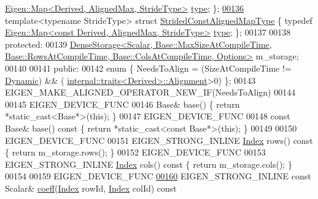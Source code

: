 \begin{DoxyCode}
      \hyperlink{group___core___module_class_eigen_1_1_map}{Eigen::Map<Derived, AlignedMax, StrideType>} 
      \hyperlink{group___core___module_class_eigen_1_1_map}{type}; \};
\hyperlink{struct_eigen_1_1_plain_object_base_1_1_strided_const_aligned_map_type}{00136}     \textcolor{keyword}{template}<\textcolor{keyword}{typename} Str\textcolor{keywordtype}{id}eType> \textcolor{keyword}{struct }\hyperlink{struct_eigen_1_1_plain_object_base_1_1_strided_const_aligned_map_type}{StridedConstAlignedMapType} \{ \textcolor{keyword}{typedef} 
      \hyperlink{group___core___module_class_eigen_1_1_map}{Eigen::Map<const Derived, AlignedMax, StrideType>} 
      \hyperlink{group___core___module_class_eigen_1_1_map}{type}; \};
00137 
00138   \textcolor{keyword}{protected}:
00139     
      \hyperlink{class_eigen_1_1_dense_storage}{DenseStorage<Scalar, Base::MaxSizeAtCompileTime, Base::RowsAtCompileTime, Base::ColsAtCompileTime, Options>}
       m\_storage;
00140 
00141   \textcolor{keyword}{public}:
00142     \textcolor{keyword}{enum} \{ NeedsToAlign = (SizeAtCompileTime != \hyperlink{namespace_eigen_ad81fa7195215a0ce30017dfac309f0b2}{Dynamic}) && (
      \hyperlink{struct_eigen_1_1internal_1_1traits}{internal::traits<Derived>::Alignment}>0) \};
00143     EIGEN\_MAKE\_ALIGNED\_OPERATOR\_NEW\_IF(NeedsToAlign)
00144 
00145     EIGEN\_DEVICE\_FUNC
00146     Base& base() \{ \textcolor{keywordflow}{return} *\textcolor{keyword}{static\_cast<}Base*\textcolor{keyword}{>}(\textcolor{keyword}{this}); \}
00147     EIGEN\_DEVICE\_FUNC
00148     \textcolor{keyword}{const} Base& base()\textcolor{keyword}{ const }\{ \textcolor{keywordflow}{return} *\textcolor{keyword}{static\_cast<}\textcolor{keyword}{const }Base*\textcolor{keyword}{>}(\textcolor{keyword}{this}); \}
00149 
00150     EIGEN\_DEVICE\_FUNC
00151     EIGEN\_STRONG\_INLINE \hyperlink{namespace_eigen_a62e77e0933482dafde8fe197d9a2cfde}{Index} rows()\textcolor{keyword}{ const }\{ \textcolor{keywordflow}{return} m\_storage.rows(); \}
00152     EIGEN\_DEVICE\_FUNC
00153     EIGEN\_STRONG\_INLINE \hyperlink{namespace_eigen_a62e77e0933482dafde8fe197d9a2cfde}{Index} cols()\textcolor{keyword}{ const }\{ \textcolor{keywordflow}{return} m\_storage.cols(); \}
00154 
00159     EIGEN\_DEVICE\_FUNC
\hyperlink{class_eigen_1_1_plain_object_base_afbfc12954f16d21aedb7bd839f64a278}{00160}     EIGEN\_STRONG\_INLINE \textcolor{keyword}{const} Scalar& \hyperlink{class_eigen_1_1_plain_object_base_afbfc12954f16d21aedb7bd839f64a278}{coeff}(\hyperlink{namespace_eigen_a62e77e0933482dafde8fe197d9a2cfde}{Index} rowId, \hyperlink{namespace_eigen_a62e77e0933482dafde8fe197d9a2cfde}{Index} colId)\textcolor{keyword}{ const}

\end{DoxyCode}
